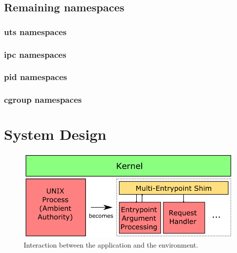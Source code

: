 \documentclass[sigplan]{acmart}
\begin{document}

\subsection{Remaining namespaces}

\subsubsection{uts namespaces}


\subsubsection{ipc namespaces}


\subsubsection{pid namespaces}


\subsubsection{cgroup namespaces}



\section{System Design}

\begin{figure}
    \centering
    \includegraphics[width=\columnwidth]{figures/self-compartmentalisation-interactions.png}
    \caption{Interaction between the application and the environment.}
    \label{fig:self-compartmentalisation-interactions}
\end{figure}
\end{document}
